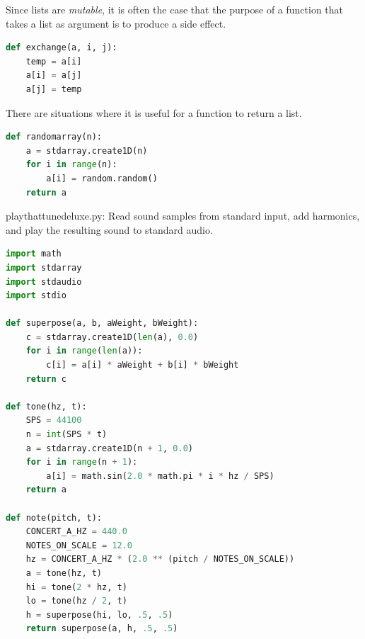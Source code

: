 \documentclass[8pt,a4paper,compress,handout]{beamer}
\begin{document}
\begin{frame}[fragile]
Since lists are \emph{mutable}, it is often the case that the purpose of a function that takes a list as argument is to produce a side effect.
\begin{lstlisting}[language=Python]
def exchange(a, i, j):
    temp = a[i]
    a[i] = a[j]
    a[j] = temp
\end{lstlisting}

\bigskip

There are situations where it is useful for a function to return a list.
\begin{lstlisting}[language=Python]
def randomarray(n):
    a = stdarray.create1D(n)
    for i in range(n):
        a[i] = random.random()
    return a
\end{lstlisting}
\end{frame}

\begin{frame}[fragile]
\begin{framed}
\tiny playthattunedeluxe.py: Read sound samples from standard input, add harmonics, and play the resulting sound to standard audio.
\end{framed}

\begin{lstlisting}[language=Python]
import math
import stdarray
import stdaudio
import stdio

def superpose(a, b, aWeight, bWeight):
    c = stdarray.create1D(len(a), 0.0)
    for i in range(len(a)):
        c[i] = a[i] * aWeight + b[i] * bWeight
    return c

def tone(hz, t):
    SPS = 44100
    n = int(SPS * t)
    a = stdarray.create1D(n + 1, 0.0)
    for i in range(n + 1):
        a[i] = math.sin(2.0 * math.pi * i * hz / SPS)
    return a

def note(pitch, t):
    CONCERT_A_HZ = 440.0
    NOTES_ON_SCALE = 12.0
    hz = CONCERT_A_HZ * (2.0 ** (pitch / NOTES_ON_SCALE))
    a = tone(hz, t)
    hi = tone(2 * hz, t)
    lo = tone(hz / 2, t)
    h = superpose(hi, lo, .5, .5)
    return superpose(a, h, .5, .5)
\end{lstlisting}
\end{frame}
\end{document}
